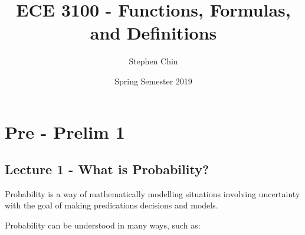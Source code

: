 \message{ !name(definitions.tex)}\documentclass{article}
\title{ECE 3100 - Functions, Formulas, and Definitions}
\author{Stephen Chin}
\date{Spring Semester 2019}
\begin{document}

\maketitle

\section{Pre - Prelim 1}

\subsection{Lecture 1 - What is Probability?}

Probability is a way of mathematically modelling situations involving
uncertainty with the goal of making predications decisions and models.

Probability can be understood in many ways, such as:
\begin{enumerate}
  
\end{enumerate}
\end{document}
